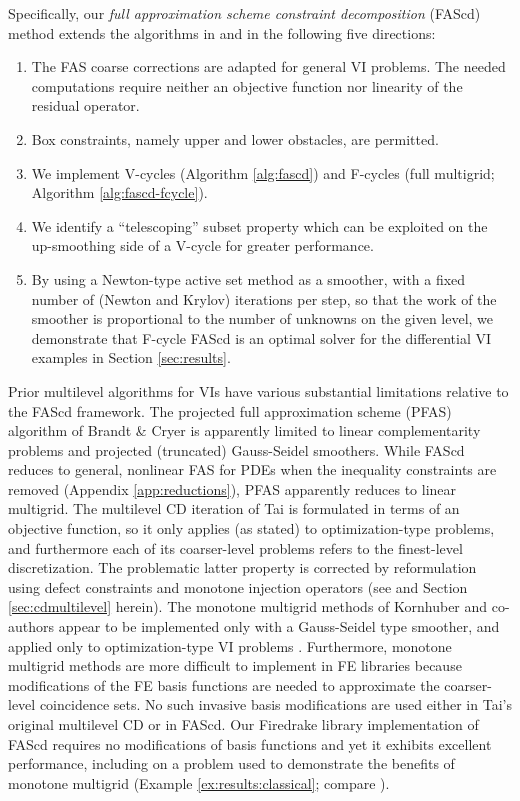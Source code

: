 \documentclass[letterpaper,final,12pt,reqno]{amsart}
\theoremstyle{cstyle}
\theoremstyle{cstyle*}
\theoremstyle{dstyle}
\numberwithin{equation}{section}
\numberwithin{figure}{section}
\numberwithin{table}{section}
\numberwithin{theorem}{section}
\begin{document}
Specifically, our \emph{full approximation scheme constraint decomposition} (FAScd) method extends the algorithms in \cite{GraeserKornhuber2009} and \cite{Tai2003} in the following five directions:
\renewcommand{\labelenumi}{\emph{(\roman{enumi})}}
\begin{enumerate}
\item The FAS coarse corrections are adapted for general VI problems. The needed computations require neither an objective function nor linearity of the residual operator.
\item Box constraints, namely upper and lower obstacles, are permitted.
\item We implement V-cycles (Algorithm \ref{alg:fascd}) and F-cycles (full multigrid; Algorithm \ref{alg:fascd-fcycle}).
\item We identify a ``telescoping'' subset property which can be exploited on the up-smoothing side of a V-cycle for greater performance.
\item By using a Newton-type active set method as a smoother, with a fixed number of (Newton and Krylov) iterations per step, so that the work of the smoother is proportional to the number of unknowns on the given level, we demonstrate that F-cycle FAScd is an optimal solver for the differential VI examples in Section \ref{sec:results}.
\end{enumerate}

Prior multilevel algorithms for VIs have various substantial limitations relative to the FAScd framework.  The projected full approximation scheme (PFAS) algorithm of Brandt \& Cryer \cite{BrandtCryer1983} is apparently limited to linear complementarity problems and projected (truncated) Gauss-Seidel smoothers.  While FAScd reduces to general, nonlinear FAS for PDEs when the inequality constraints are removed (Appendix \ref{app:reductions}), PFAS apparently reduces to linear multigrid.  The multilevel CD iteration of Tai \cite{Tai2003} is formulated in terms of an objective function, so it only applies (as stated) to optimization-type problems, and furthermore each of its coarser-level problems refers to the finest-level discretization.  The problematic latter property is corrected by reformulation using defect constraints and monotone injection operators (see \cite[Algorithm 4.7]{GraeserKornhuber2009} and Section \ref{sec:cdmultilevel} herein).  The monotone multigrid methods of Kornhuber and co-authors \cite{GraeserKornhuber2009,Kornhuber1994} appear to be implemented only with a Gauss-Seidel type smoother, and applied only to optimization-type VI problems \cite[for example]{JouvetGraeser2013}.  Furthermore, monotone multigrid methods are more difficult to implement in FE libraries because modifications of the FE basis functions are needed to approximate the coarser-level coincidence sets.  No such invasive basis modifications are used either in Tai's original multilevel CD or in FAScd.  Our Firedrake library \cite{Rathgeberetal2016} implementation of FAScd requires no modifications of basis functions and yet it exhibits excellent performance, including on a problem used to demonstrate the benefits of monotone multigrid (Example \ref{ex:results:classical}; compare \cite[problem 7.1.1]{GraeserKornhuber2009}).
\end{document}
